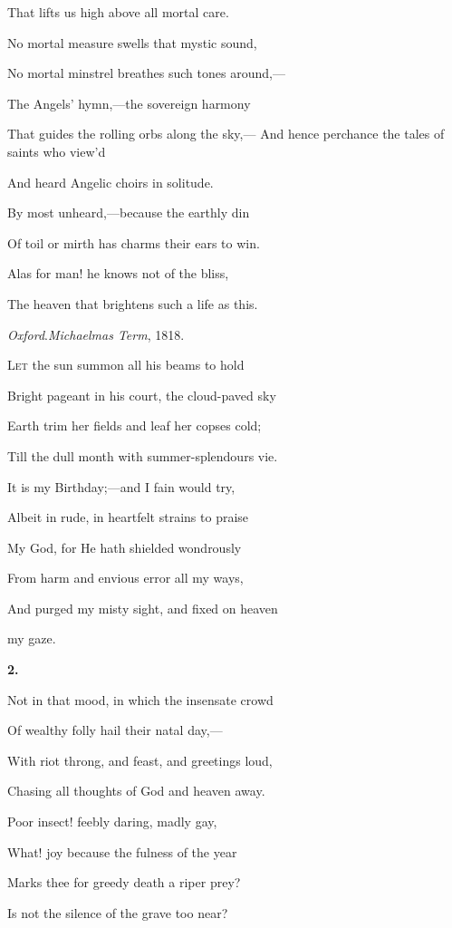 That lifts us high above all mortal care.

No mortal measure swells that mystic sound,

No mortal minstrel breathes such tones around,—

The Angels' hymn,—the sovereign harmony

That guides the rolling orbs along the sky,— And hence perchance the tales of saints who view'd

And heard Angelic choirs in solitude.

By most unheard,—because the earthly din

Of toil or mirth has charms their ears to win.

Alas for man! he knows not of the bliss,

The heaven that brightens such a life as this.

\emph{Oxford}.\emph{Michaelmas Term}, 1818.


L\textsc{et} the sun summon all his beams to hold

Bright pageant in his court, the
cloud-paved sky

Earth trim her fields and leaf her copses cold;

Till the dull month with summer-splendours
vie.

It is my Birthday;—and I fain would try,

Albeit in rude, in heartfelt strains to praise

My God, for He hath shielded wondrously

From harm and envious error all my ways,

And purged my misty sight, and fixed on heaven

my gaze.

\textbf{2.}

Not in that mood, in which the insensate crowd

Of wealthy folly hail their natal day,—

With riot throng, and feast, and greetings loud,

Chasing all thoughts of God and heaven
away.

Poor insect! feebly daring, madly gay,

What! joy because the fulness of the year

Marks thee for greedy death a riper prey?

Is not the silence of the grave too near?

